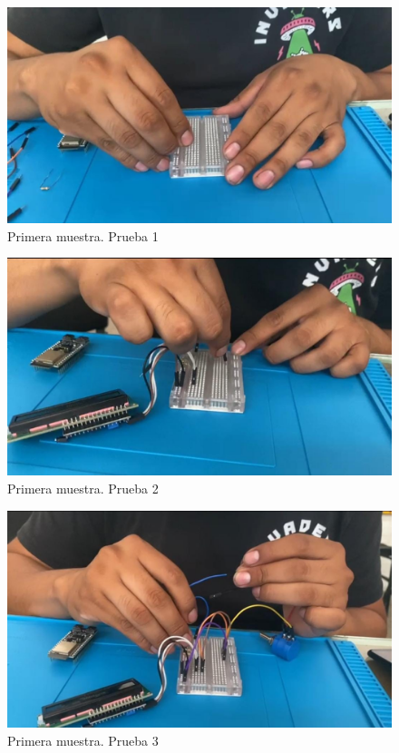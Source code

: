 \begin{figure}[H]
        \centering
        \includegraphics[trim = {0mm 0mm 0mm 0mm},clip,scale=0.2]{10/Img/muestra1Prueba1.jpg}
        \caption{Primera muestra. Prueba 1}
        \label{Prueba 1}
    \end{figure}

\begin{figure}[H]
        \centering
        \includegraphics[trim = {0mm 0mm 0mm 0mm},clip,scale=0.2]{10/Img/muestra1Prueba2.jpg}
        \caption{Primera muestra. Prueba 2}
        \label{Prueba 2}
    \end{figure}

\begin{figure}[H]
        \centering
        \includegraphics[trim = {0mm 0mm 0mm 0mm},clip,scale=0.2]{10/Img/muestra1Prueba3.jpg}
        \caption{Primera muestra. Prueba 3}
        \label{Prueba 3}
    \end{figure}

